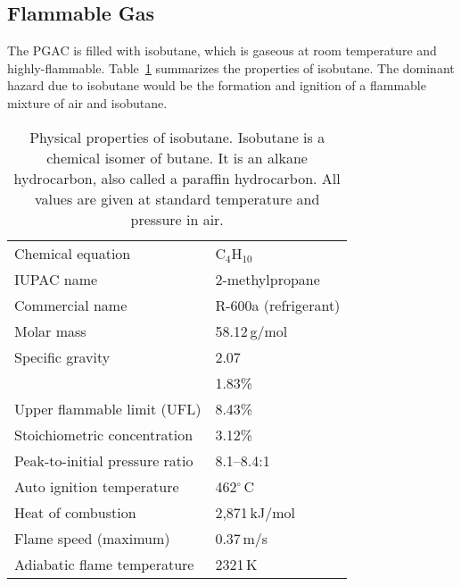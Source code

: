 \subsection{Flammable Gas}
\label{flame}
The PGAC is filled with %
isobutane, which is gaseous at room temperature and highly-flammable.
Table~\ref{isobutane} summarizes the properties of isobutane.
The dominant hazard due to isobutane would be the formation and ignition of a flammable mixture of air and isobutane.
\begin{table}
\begin{center}
\begin{tabular}{p{}|p{}} 
\raggedleft Chemical equation&C$_4$H$_{10}$\\
\raggedleft IUPAC name&2-methylpropane\\
\raggedleft Commercial name&R-600a (refrigerant)\\
\raggedleft Molar mass&58.12\,g/mol\\
\raggedleft Specific gravity&2.07\\
\raggedleft {Lower flammable limit (LFL)}%
& {1.83\%}\\
\raggedleft Upper flammable limit (UFL)&8.43\%\\
\raggedleft Stoichiometric concentration %
&3.12\% \\
\raggedleft Peak-to-initial pressure ratio %
&8.1--8.4:1\\%
\raggedleft Auto ignition temperature%
&462$^\circ$\,C\\
\raggedleft Heat of combustion%
&%
2,871\,kJ/mol%
\\
\raggedleft Flame speed (maximum)&0.37\,m/s\\
\raggedleft Adiabatic flame temperature&%
2321\,K\\
\end{tabular}\\
\end{center}

\caption{ Physical properties of isobutane.  Isobutane is a chemical isomer of butane.  It is an alkane hydrocarbon, also called a paraffin hydrocarbon. %
All values are given at standard temperature and pressure in air.}
\label{isobutane}
\end{table}

